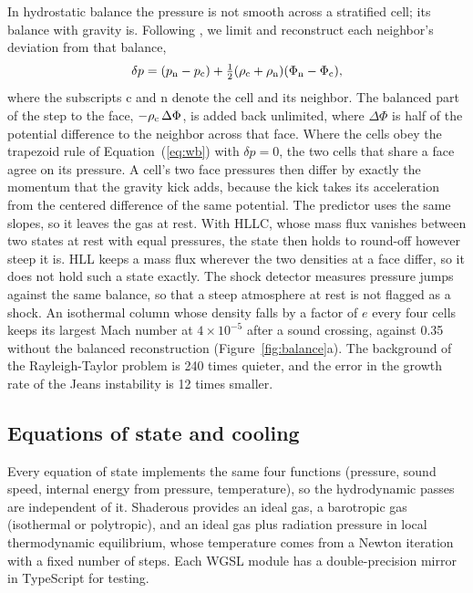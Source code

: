 \documentclass[twocolumn]{aastex701}
\begin{document}
In hydrostatic balance the pressure is not smooth across a stratified cell; its balance with gravity is. Following \citet{Kappeli2014, Kappeli2016}, we limit and reconstruct each neighbor's deviation from that balance,
\begin{equation}
\delta p = (p_{\rm n} - p_{\rm c}) + \tfrac{1}{2}(\rho_{\rm c} + \rho_{\rm n})(\Phi_{\rm n} - \Phi_{\rm c}),
\label{eq:wb}
\end{equation}
where the subscripts c and n denote the cell and its neighbor. The balanced part of the step to the face, $-\rho_{\rm c}\,\Delta\Phi$, is added back unlimited, where $\Delta\Phi$ is half of the potential difference to the neighbor across that face. Where the cells obey the trapezoid rule of Equation~(\ref{eq:wb}) with $\delta p = 0$, the two cells that share a face agree on its pressure. A cell's two face pressures then differ by exactly the momentum that the gravity kick adds, because the kick takes its acceleration from the centered difference of the same potential. The predictor uses the same slopes, so it leaves the gas at rest. With HLLC, whose mass flux vanishes between two states at rest with equal pressures, the state then holds to round-off however steep it is. HLL keeps a mass flux wherever the two densities at a face differ, so it does not hold such a state exactly. The shock detector measures pressure jumps against the same balance, so that a steep atmosphere at rest is not flagged as a shock. An isothermal column whose density falls by a factor of $e$ every four cells keeps its largest Mach number at $4 \times 10^{-5}$ after a sound crossing, against 0.35 without the balanced reconstruction (Figure~\ref{fig:balance}a). The background of the Rayleigh-Taylor problem is 240 times quieter, and the error in the growth rate of the Jeans instability is 12 times smaller.


\subsection{Equations of state and cooling}
\label{sec:eos}

Every equation of state implements the same four functions (pressure, sound speed, internal energy from pressure, temperature), so the hydrodynamic passes are independent of it. Shaderous provides an ideal gas, a barotropic gas (isothermal or polytropic), and an ideal gas plus radiation pressure in local thermodynamic equilibrium, whose temperature comes from a Newton iteration with a fixed number of steps. Each WGSL module has a double-precision mirror in TypeScript for testing.
\end{document}
